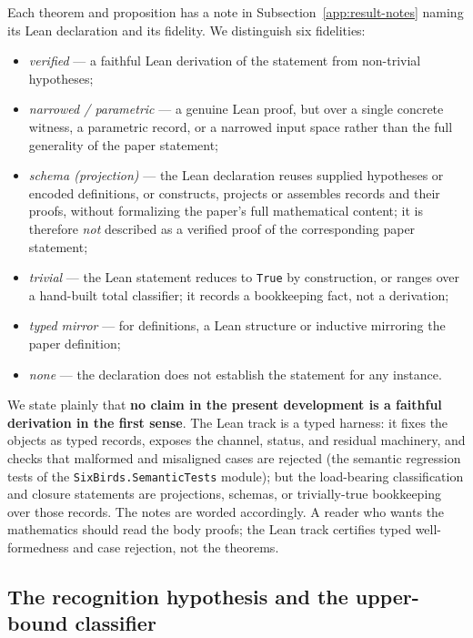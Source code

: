 \documentclass[11pt]{article}
\theoremstyle{definition}
\begin{document}
Each theorem and proposition has a note in Subsection~\ref{app:result-notes}
naming its Lean declaration and its fidelity. We distinguish six fidelities:
\begin{itemize}[topsep=2pt,itemsep=1pt]
  \item \emph{verified} --- a faithful Lean derivation of the statement from
    non-trivial hypotheses;
  \item \emph{narrowed / parametric} --- a genuine Lean proof, but over a single
    concrete witness, a parametric record, or a narrowed input space rather than
    the full generality of the paper statement;
  \item \emph{schema (projection)} --- the Lean declaration reuses
    supplied hypotheses or encoded definitions, or constructs, projects or
    assembles records and their proofs, without formalizing the paper's
    full mathematical content; it is therefore \emph{not} described as a
    verified proof of the corresponding paper statement;
  \item \emph{trivial} --- the Lean statement reduces to \texttt{True} by
    construction, or ranges over a hand-built total classifier; it records a
    bookkeeping fact, not a derivation;
  \item \emph{typed mirror} --- for definitions, a Lean structure or inductive
    mirroring the paper definition;
  \item \emph{none} --- the declaration does not establish the statement for
    any instance.
\end{itemize}
We state plainly that \textbf{no claim in the present development is a faithful
derivation in the first sense}. The Lean track is a typed harness: it fixes the
objects as typed records, exposes the channel, status, and residual machinery,
and checks that malformed and misaligned cases are rejected (the semantic
regression tests of the \texttt{SixBirds.SemanticTests} module); but the
load-bearing classification and closure statements are projections, schemas, or
trivially-true bookkeeping over those records. The notes are worded
accordingly. A reader who wants the mathematics should read the body proofs; the
Lean track certifies typed well-formedness and case rejection, not the theorems.

\subsection{The recognition hypothesis and the upper-bound classifier}\label{app:recognition}
\end{document}
